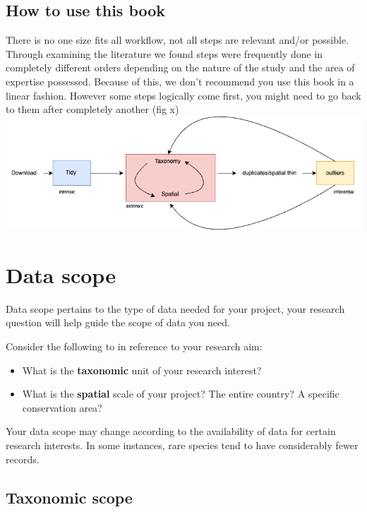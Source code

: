 \documentclass[
  letterpaper,
  DIV=11,
  numbers=noendperiod,
  oneside]{scrreprt}
\providecommand{\tightlist}{%
  \setlength{\itemsep}{0pt}\setlength{\parskip}{0pt}}\usepackage{longtable,booktabs,array}
\begin{document}
\hypertarget{how-to-use-this-book}{%
\section{How to use this book}\label{how-to-use-this-book}}

There is no one size fits all workflow, not all steps are relevant
and/or possible. Through examining the literature we found steps were
frequently done in completely different orders depending on the nature
of the study and the area of expertise possessed. Because of this, we
don't recommend you use this book in a linear fashion. However some
steps logically come first, you might need to go back to them after
completely another (fig x)
\includegraphics{images/data.cleaning-Page-2.drawio.png}


\hypertarget{data-scope}{%
\chapter{Data scope}\label{data-scope}}

Data scope pertains to the type of data needed for your project, your
research question will help guide the scope of data you need.

Consider the following to in reference to your research aim:

\begin{itemize}
\tightlist
\item
  What is the \textbf{taxonomic} unit of your research interest?
\item
  What is the \textbf{spatial} scale of your project? The entire
  country? A specific conservation area?
\end{itemize}

Your data scope may change according to the availability of data for
certain research interests. In some instances, rare species tend to have
considerably fewer records.

\hypertarget{taxonomic-scope}{%
\section{Taxonomic scope}\label{taxonomic-scope}}
\end{document}
